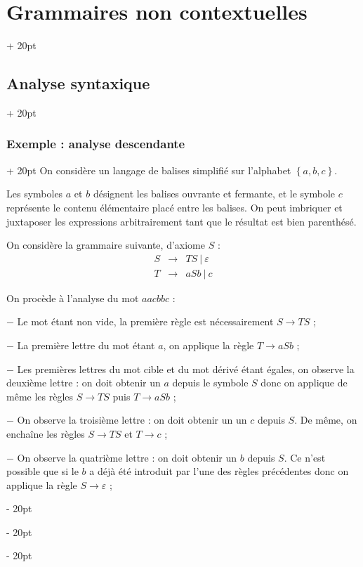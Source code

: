 \documentclass[a4paper, 12pt, twoside]{article}
\newcommand{\set}[1]{\left\{ #1 \right\}}
\newcommand{\ind}[1][20pt]{\advance\leftskip + #1}
\newcommand{\deind}[1][20pt]{\advance\leftskip - #1}
\newenvironment{indt}[2][20pt]{#2 \par \ind[#1]}{\par \deind} %
\begin{document}
\begin{indt}{\section{Grammaires non contextuelles}}
\begin{indt}{\subsection{Analyse syntaxique}}
            \vspace{12pt}
            
            \begin{indt}{\subsubsection{Exemple : analyse descendante}}
                On considère un langage de balises simplifié sur l'alphabet $\set{a, b, c}$.

                Les symboles $a$ et $b$ désignent les balises ouvrante et fermante, et le symbole $c$ représente le contenu élémentaire placé entre les balises.
                On peut imbriquer et juxtaposer les expressions arbitrairement tant que le résultat est bien parenthésé.

                On considère la grammaire suivante, d'axiome $S$ :
                \[
                    \begin{array}{rcl}
                        S
                        &\rightarrow& TS \ |\ \varepsilon
                        \\
                        T
                        &\rightarrow& aSb \ |\ c
                    \end{array}
                \]

                On procède à l'analyse du mot $aacbbc$ :

                \vspace{6pt}
                
                $-$ Le mot étant non vide, la première règle est nécessairement $S \rightarrow TS$ ;

                $-$ La première lettre du mot étant $a$, on applique la règle $T \rightarrow aSb$ ;

                $-$ Les premières lettres du mot cible et du mot dérivé étant égales, on observe la deuxième lettre : on doit obtenir  un $a$ depuis le symbole $S$ donc on applique de même les règles $S \rightarrow TS$ puis $T \rightarrow aSb$ ;

                $-$ On observe la troisième lettre : on doit obtenir un un $c$ depuis $S$. De même, on enchaîne les règles $S \rightarrow TS$ et $T \rightarrow c$ ;

                $-$ On observe la quatrième lettre : on doit obtenir un $b$ depuis $S$. Ce n'est possible que si le $b$ a déjà été introduit par l'une des règles précédentes donc on applique la règle $S \rightarrow \varepsilon$ ;


\end{indt}
\end{indt}
\end{indt}
\end{document}
